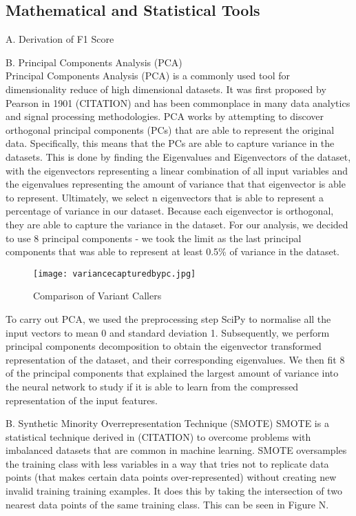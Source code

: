 \documentclass{article}
\begin{document}
\subsection{Mathematical and Statistical Tools}
A. Derivation of F1 Score 


B. Principal Components Analysis (PCA)\\
Principal Components Analysis (PCA) is a commonly used tool for dimensionality reduce of high dimensional datasets. It was first proposed by Pearson in 1901 (CITATION) and has been commonplace in many data analytics and signal processing methodologies. PCA works by attempting to discover orthogonal principal components (PCs) that are able to represent the original data. Specifically, this means that the PCs are able to capture variance in the datasets. This is done by finding the Eigenvalues and Eigenvectors of the dataset, with the eigenvectors representing a linear combination of all input variables and the eigenvalues representing the amount of variance that that eigenvector is able to represent. Ultimately, we select n eigenvectors that is able to represent a percentage of variance in our dataset. Because each eigenvector is orthogonal, they are able to capture the variance in the dataset. For our analysis, we decided to use 8 principal components - we took the limit as the last principal components that was able to represent at least 0.5\% of variance in the dataset.
 
\begin{figure}[H]
\texttt{[image: variancecapturedbypc.jpg]}
\caption{Comparison of Variant Callers}
\centering
\end{figure}

To carry out PCA, we used the preprocessing step SciPy to normalise all the input vectors to mean 0 and standard deviation 1. Subsequently, we perform principal components decomposition to obtain the eigenvector transformed representation of the dataset, and their corresponding eigenvalues. We then fit 8 of the principal components that explained the largest amount of variance into the neural network to study if it is able to learn from the compressed representation of the input features. 

B. Synthetic Minority Overrepresentation Technique (SMOTE)
SMOTE is a statistical technique derived in (CITATION) to overcome problems with imbalanced datasets that are common in machine learning. SMOTE oversamples the training class with less variables in a way that tries not to replicate data points (that makes certain data points over-represented) without creating new invalid training training examples. It does this by taking the intersection of two nearest data points of the same training class. This can be seen in Figure N. 
\end{document}
